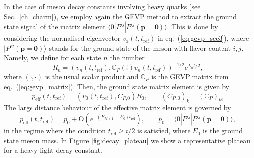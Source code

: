 In the case of meson decay constants involving heavy quarks (see Sec.~\ref{ch_charm}), we employ again the GEVP method to extract the ground state signal of the matrix element $ \langle 0 | P^{ij} | P^{ij}(\mathbf{p=0})\rangle $. This is done by considering the normalised eigenvector $v_n(t,t_{\mathrm{ref}})$ in eq.~(\ref{eq:gevp_sec3}),
where $| P^{ij}(\mathbf{p=0})\rangle$ stands for the ground state of the meson with flavor content $i,j$.  Namely, we define for each state $n$ the number \cite{Blossier:2009kd}
\begin{equation}
	R_n = \left(v_n(t,t_{\mathrm{ref}}),\mathit{\mathbb{C}}_{P}(t)v_n(t,t_{\mathrm{ref}})\right)^{-1/2} e^{E_nt/2},
	\label{eq:gevp_effective_operator}
\end{equation}
where $(\cdot, \cdot)$ is the usual scalar product and $\mathit{\mathbb{C}}_{P}$ is the GEVP matrix from eq.~(\ref{eq:gevp_matrix}).  Then, the ground state matrix element is given by
\begin{equation}
	p_{\mathrm{eff}}(t,t_{\mathrm{ref}}) = (v_0(t,t_{\mathrm{ref}}), C_{P,0}) R_0, \qquad (C_{P,0})_k = (\mathit{\mathbb{C}}_{P})_{k0} 
	\label{eq:effective_matrix_element}
\end{equation}
The large distance behaviour of the effective matrix element is governed by 
\begin{equation}
	p_{\mathrm{eff}}(t,t_{\mathrm{ref}}) = p_0 + \mbox{O}(e^{-(E_{N+1}-E_0) t_{\mathrm{ref}}}), \qquad p_0 =  \langle 0 | P^{ij} | P^{ij}(\mathbf{p=0})\rangle,
\end{equation}
in the regime where the condition $t_{\mathrm{ref}}\geq t/2$ is satisfied, where $E_0$ is the ground state meson mass. In Figure \ref{fig:decay_plateau} we show a representative plateau for a heavy-light decay constant.


